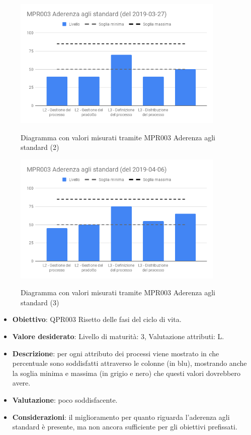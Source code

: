    \begin{figure}[H]
        \centering
        \includegraphics[width=0.9\textwidth]{img/cruscotti/MPR003_(2).png}
        \label{immagineAderenzaStandard2}
        \caption{Diagramma con valori misurati tramite MPR003 Aderenza agli standard (2)}
    \end{figure}
    
    \begin{figure}[H]
        \centering
        \includegraphics[width=0.9\textwidth]{img/cruscotti/MPR003_(3).png}
        \label{immagineAderenzaStandard3}
        \caption{Diagramma con valori misurati tramite MPR003 Aderenza agli standard (3)}
    \end{figure}

	\begin{itemize}
		\item \textbf{Obiettivo}: QPR003 Risetto delle fasi del ciclo di vita.
		\item \textbf{Valore desiderato}: Livello di maturità: 3, Valutazione attributi: L.
		\item \textbf{Descrizione}: per ogni attributo dei processi viene mostrato in che percentuale sono soddisfatti attraverso le colonne (in blu), mostrando anche la soglia minima e massima (in grigio e nero) che questi valori dovrebbero avere.
		\item \textbf{Valutazione}: poco soddisfacente.
		\item \textbf{Considerazioni}: il miglioramento per quanto riguarda l'aderenza agli standard è presente, ma non ancora sufficiente per gli obiettivi prefissati.
	\end{itemize}
	



